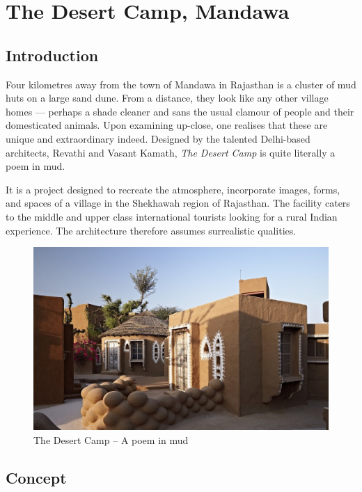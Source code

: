 \section{The Desert Camp, Mandawa} %
\label{sec:dcm}

\subsection{Introduction} %
\label{sub:dcm_intro}

Four kilometres away from the town of Mandawa in Rajasthan is a cluster of mud huts on a large sand dune. From a distance, they look like any other village homes --- perhaps a shade cleaner and sans the usual clamour of people and their domesticated animals. Upon examining up-close, one realises that these are unique and extraordinary indeed. Designed by the talented Delhi-based architects, Revathi and Vasant Kamath, \emph{The Desert Camp} is quite literally a poem in mud.

It is a project designed to recreate the atmosphere, incorporate images, forms, and spaces of a village in the Shekhawah region of Rajasthan. The facility caters to the middle and upper class international tourists looking for a rural Indian experience. The architecture therefore assumes surrealistic qualities.

\begin{figure}[H]
  \centering
  \includegraphics[angle=0,width=1.0\textwidth]{img/dc-01}
  \caption{The Desert Camp -- A poem in mud}
  \label{fig:dc-01} 
\end{figure}


\subsection{Concept} %
\label{sub:dcm_concept}

